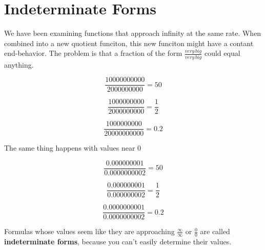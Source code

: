 \documentclass{ximera}
\begin{document}
\section{Indeterminate Forms}


We have been examining functions that approach infinity at the same rate. When combined into a new quotient funciton, this new funciton might have a contant end-behavior.  The problem is that a fraction of the form $\frac{very \, big}{very \, big}$ could equal anything.



\[  \frac{10000000000}{2000000000} = 50      \]

\[  \frac{1000000000}{2000000000} = \frac{1}{2}      \]

\[  \frac{1000000000}{20000000000} = 0.2      \]





The same thing happens with values near $0$


\[  \frac{0.000000001}{0.0000000002} = 50      \]

\[  \frac{0.000000001}{0.000000002} = \frac{1}{2}      \]

\[  \frac{0.0000000001}{0.0000000002} = 0.2      \]





Formulas whose values seem like they are approaching $\frac{\infty}{\infty}$ or $\frac{0}{0}$ are called \textbf{indeterminate forms}, because you can't easily determine their values.
\end{document}
